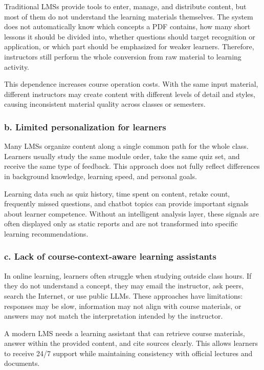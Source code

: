 Traditional LMSs provide tools to enter, manage, and distribute content, but
most of them do not understand the learning materials themselves. The system
does not automatically know which concepts a PDF contains, how many short
lessons it should be divided into, whether questions should target recognition
or application, or which part should be emphasized for weaker learners.
Therefore, instructors still perform the whole conversion from raw material to
learning activity.

This dependence increases course operation costs. With the same input material,
different instructors may create content with different levels of detail and
styles, causing inconsistent material quality across classes or semesters.

\subsubsection*{b. Limited personalization for learners}

Many LMSs organize content along a single common path for the whole class.
Learners usually study the same module order, take the same quiz set, and
receive the same type of feedback. This approach does not fully reflect
differences in background knowledge, learning speed, and personal goals.

Learning data such as quiz history, time spent on content, retake count,
frequently missed questions, and chatbot topics can provide important signals
about learner competence. Without an intelligent analysis layer, these signals
are often displayed only as static reports and are not transformed into
specific learning recommendations.

\subsubsection*{c. Lack of course-context-aware learning assistants}

In online learning, learners often struggle when studying outside class hours.
If they do not understand a concept, they may email the instructor, ask peers,
search the Internet, or use public LLMs. These approaches have limitations:
responses may be slow, information may not align with course materials, or
answers may not match the interpretation intended by the instructor.

A modern LMS needs a learning assistant that can retrieve course materials,
answer within the provided content, and cite sources clearly. This allows
learners to receive 24/7 support while maintaining consistency with official
lectures and documents.

